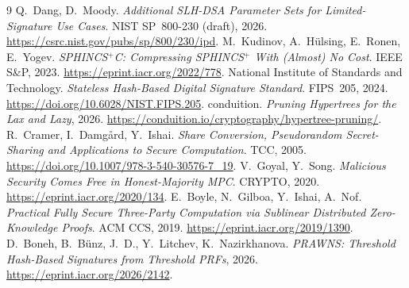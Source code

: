 \documentclass[11pt]{article}
\begin{document}
\begin{thebibliography}{9}
 Q.~Dang, D.~Moody. \emph{Additional SLH-DSA Parameter Sets for Limited-Signature Use
  Cases}. NIST SP~800-230 (draft), 2026. \url{https://csrc.nist.gov/pubs/sp/800/230/ipd}.
 M.~Kudinov, A.~H\"ulsing, E.~Ronen, E.~Yogev. \emph{SPHINCS$^+$C: Compressing SPHINCS$^+$
  With (Almost) No Cost}. IEEE S\&P, 2023. \url{https://eprint.iacr.org/2022/778}.
 National Institute of Standards and Technology. \emph{Stateless Hash-Based Digital Signature
  Standard}. FIPS~205, 2024. \url{https://doi.org/10.6028/NIST.FIPS.205}.
 conduition. \emph{Pruning Hypertrees for the Lax and Lazy}, 2026.
  \url{https://conduition.io/cryptography/hypertree-pruning/}.
 R.~Cramer, I.~Damg{\aa}rd, Y.~Ishai. \emph{Share Conversion, Pseudorandom Secret-Sharing and
  Applications to Secure Computation}. TCC, 2005. \url{https://doi.org/10.1007/978-3-540-30576-7_19}.
 V.~Goyal, Y.~Song. \emph{Malicious Security Comes Free in Honest-Majority MPC}. CRYPTO, 2020.
  \url{https://eprint.iacr.org/2020/134}.
 E.~Boyle, N.~Gilboa, Y.~Ishai, A.~Nof. \emph{Practical Fully Secure Three-Party
  Computation via Sublinear Distributed Zero-Knowledge Proofs}. ACM CCS, 2019.
  \url{https://eprint.iacr.org/2019/1390}.
 D.~Boneh, B.~B\"unz, J.~D., Y.~Litchev, K.~Nazirkhanova. \emph{PRAWNS: Threshold Hash-Based
  Signatures from Threshold PRFs}, 2026. \url{https://eprint.iacr.org/2026/2142}.
\end{thebibliography}
\end{document}
